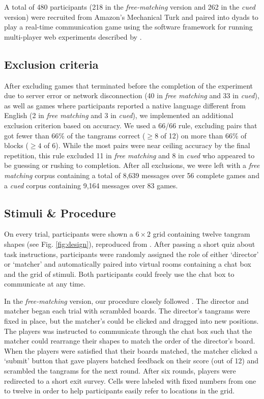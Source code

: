 \documentclass[alpha-refs]{wiley-article}
\begin{document}
A total of 480 participants (218 in the \emph{free-matching} version and 262 in the \emph{cued} version) were recruited from Amazon's Mechanical Turk and paired into dyads to play a real-time communication game using the software framework for running multi-player web experiments described by \cite{Hawkins15_RealTimeWebExperiments}. 

\subsection{Exclusion criteria}

After excluding games that terminated before the completion of the experiment due to server error or network disconnection (40 in \emph{free matching} and 33 in \emph{cued}), as well as games where participants reported a native language different from English (2 in \emph{free matching} and 3 in \emph{cued}), we implemented an additional exclusion criterion based on accuracy. 
We used a 66/66 rule, excluding pairs that got fewer than 66\% of the tangrams correct ($\ge8$ of 12) on more than 66\% of blocks ($\ge4$ of 6). 
While the most pairs were near ceiling accuracy by the final repetition, this rule excluded 11 in \emph{free matching} and 8 in \emph{cued} who appeared to be guessing or rushing to completion. 
After all exclusions, we were left with a \emph{free matching} corpus containing a total of 8,639 messages over 56 complete games and a \emph{cued} corpus containing 9,164 messages over 83 games.

\subsection{Stimuli \& Procedure}\label{stimuli}

On every trial, participants were shown a \(6 \times 2\) grid containing twelve tangram shapes (see Fig. \ref{fig:design}), reproduced from \cite{ClarkWilkesGibbs86_ReferringCollaborative}.  
After passing a short quiz about task instructions, participants were randomly assigned the role of either `director' or `matcher' and automatically paired into virtual rooms containing a chat box and the grid of stimuli. 
Both participants could freely use the chat box to communicate at any time. 

In the \emph{free-matching} version, our procedure closely followed \cite{ClarkWilkesGibbs86_ReferringCollaborative}. 
The director and matcher began each trial with scrambled boards. 
The director's tangrams were fixed in place, but the matcher's could be clicked and dragged into new positions.
The players was instructed to communicate through the chat box such that the matcher could rearrange their shapes to match the order of the director's board.
When the players were satisfied that their boards matched, the matcher clicked a `submit' button that gave players batched feedback on their score (out of 12) and scrambled the tangrams for the next round. 
After six rounds, players were redirected to a short exit survey. 
Cells were labeled with fixed numbers from one to twelve in order to help participants easily refer to locations in the grid.
\end{document}
